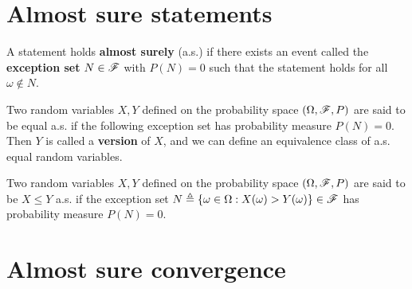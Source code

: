 \documentclass[letterpaper,10pt,english]{article}
\begin{document}
\section{Almost sure statements}
\begin{defn} 
A statement holds \textbf{almost surely} (a.s.) if there exists an event called the \textbf{exception set} $N \in \mathscr{F}$ with $P(N) = 0$ such that the statement holds for all $\omega \notin N$. 
\end{defn}
\begin{shaded}
\begin{exmp} 
Two random variables $X, Y$ defined on the probability space $(\Omega, \mathscr{F}, P)$ are said to be equal a.s. if the following exception set 
has probability measure $P(N) = 0$. 
Then $Y$ is called a \textbf{version} of $X$, and we can define an equivalence class of a.s. equal random variables. 
\end{exmp}
\begin{exmp} 
Two random variables $X, Y$ defined on the probability space $(\Omega, \mathscr{F}, P)$ are said to be $X \le Y$ a.s. if the exception set $N \triangleq \left\{\omega \in \Omega: X(\omega) > Y(\omega)\right\} \in \mathscr{F}$ has probability measure $P(N) = 0$. 
\end{exmp}
\end{shaded}

\section{Almost sure convergence}
\end{document}
